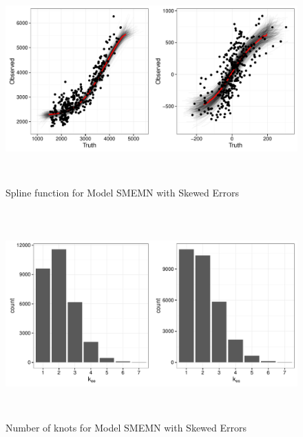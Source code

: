\documentclass[11pt]{article}\usepackage[]{graphicx}\usepackage[]{color}
\begin{document}

  \begin{figure}
  \centering
  \includegraphics[width=17cm,height=8cm]{manual_figure/predbvnsx.pdf}
  \caption{Spline function for Model SMEMN with Skewed Errors}
  \label{predSMEMNx}
  \end{figure}
  
    \begin{figure}
  \centering
  \includegraphics[width=17cm,height=8cm]{manual_figure/khist.pdf}
  \caption{Number of knots for Model SMEMN with Skewed Errors}
  \label{knots}
  \end{figure}

\end{document}
